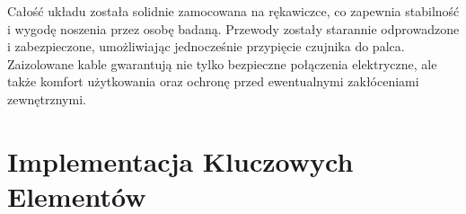 Całość układu została solidnie zamocowana na rękawiczce, co zapewnia stabilność i wygodę noszenia przez osobę badaną. Przewody zostały starannie odprowadzone i zabezpieczone, umożliwiając jednocześnie przypięcie czujnika do palca. Zaizolowane kable gwarantują nie tylko bezpieczne połączenia elektryczne, ale także komfort użytkowania oraz ochronę przed ewentualnymi zakłóceniami zewnętrznymi.

\section{Implementacja Kluczowych Elementów}